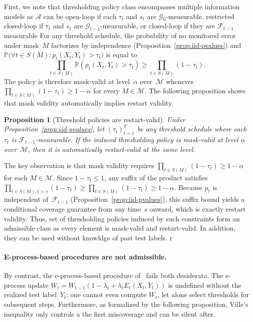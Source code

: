\documentclass{uai2026} %
\newtheorem{proposition}[theorem]{Proposition}
\newcommand{\1}{\mathbf{1}}
\newcommand{\prob}{\mathbb{P}}
\newcommand{\test}{\mathrm{test}}
\newcommand{\scal}{\mathcal{S}}
\newcommand{\F}{\mathcal{F}}
\newcommand{\G}{\mathcal{G}}
\newcommand{\fcal}{\F}
\newcommand{\mcal}{\mathcal{M}}
\newcommand{\scaltest}{\scal_{\test}}
\newcommand{\acal}{\mathcal{A}}
\begin{document}
First, we note that thresholding policy class encompasses multiple information models as $\acal$ can be open-loop if each $\tau_t$ and $s_t$ are $\G_0$-measurable, restricted closed-loop if $\tau_t$ and $s_t$ are $\G_{t-1}$-measurable, or closed-loop if they are $\fcal_{t-1}$ measurable For any threshold schedule, the probability of no monitored error under mask~$M$ factorizes by independence (Proposition~\ref{prop:iid-pvalues}) and $\prob\bigl(\forall t \in S(M): p_t(X_t, Y_t) > \tau_t\bigr)$ is equal to
\begin{equation}
  \label{eq:product-form}
  \prod_{t \in S(M)} \prob(p_t(X_t, Y_t) > \tau_t)
  \ge \prod_{t \in S(M)} (1 - \tau_t).
\end{equation}
The policy is therefore mask-valid at level~$\alpha$ over~$\mcal$ whenever $\prod_{t \in S(M)} (1 - \tau_t) \ge 1-\alpha$ for every $M \in \mcal$.
The following proposition shows that mask validity automatically implies restart validity.

\begin{proposition}[Threshold policies are restart-valid]
  \label{prop:open-loop-restart}
  Under Proposition~\ref{prop:iid-pvalues}, let $(\tau_t)_{t=1}^T$ be any threshold schedule where each $\tau_t$ is $\F_{t-1}$-measurable.
  If the induced thresholding policy is mask-valid at level $\alpha$ over~$\mcal$, then it is automatically restart-valid at the same level.
\end{proposition}

The key observation is that mask validity requires $\prod_{t \in S(M)} (1-\tau_t) \ge 1-\alpha$ for each $M \in \mcal$.
Since $1-\tau_t \le 1$, any suffix of the product satisfies $\prod_{t \in S(M), t > s} (1-\tau_t) \ge \prod_{t \in S(M)} (1-\tau_t) \ge 1-\alpha$.
Because $p_t$ is independent of~$\F_{t-1}$ (Proposition~\ref{prop:iid-pvalues}), this suffix bound yields a conditional coverage guarantee from any time~$s$ onward, which is exactly restart validity. Thus, set of thresholding policies induced by such constraints form an admissible class as every element is mask-valid and restart-valid. In addition, they can be used without knowldge of past test labels.  r


\paragraph{E-process-based procedures are not admissible.}
By contrast, the e-process-based procedure of~\citet{gauthier2025values} fails both desiderata.
The e-process update $W_t = W_{t-1}(1-\lambda_t + \lambda_t E_t(X_t, Y_t))$ is undefined without the realized test label~$Y_t$: one cannot even compute $W_t$, let alone select thresholds for subsequent steps.
Furthermore, as formalized by the following proposition, Ville's inequality only controls a the first miscoverage and can be silent after.
\end{document}
